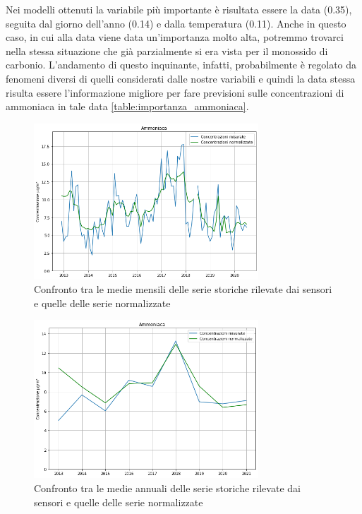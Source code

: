\documentclass[a4paper]{report}
\begin{document}
Nei modelli ottenuti la variabile più importante è risultata essere la data (0.35), seguita dal giorno dell'anno (0.14) e dalla temperatura (0.11). Anche in questo caso, in cui alla data viene data un'importanza molto alta, potremmo trovarci nella stessa situazione che già parzialmente si era vista per il monossido di carbonio. L'andamento di questo inquinante, infatti, probabilmente è regolato da fenomeni diversi di quelli considerati dalle nostre variabili e quindi la data stessa risulta essere l'informazione migliore per fare previsioni sulle concentrazioni di ammoniaca in tale data \ref{table:importanza_ammoniaca}.

\begin{figure}[h]
\centering
\includegraphics[width=0.75\textwidth]{ammoniaca_medie_mensili}
\caption{Confronto tra le medie mensili delle serie storiche rilevate dai sensori e quelle delle serie normalizzate}
\label{fig:ammoniaca_medie_mensili}
\end{figure}

\begin{figure}[h]
\centering
\includegraphics[width=0.75\textwidth]{ammoniaca_medie_annuali}
\caption{Confronto tra le medie annuali delle serie storiche rilevate dai sensori e quelle delle serie normalizzate}
\label{fig:ammoniaca_medie_annuali}
\end{figure}
\end{document}
